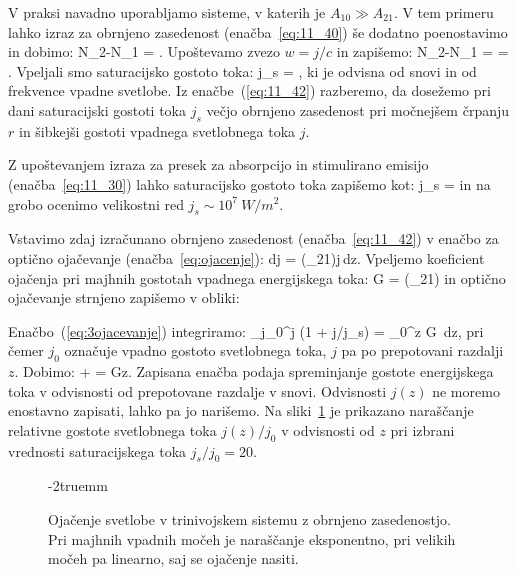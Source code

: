 V praksi navadno uporabljamo sisteme, v katerih je $A_{10}\gg A_{21}$.
V tem primeru lahko izraz za obrnjeno zasedenost (enačba~\ref{eq:11_40}) 
še dodatno poenostavimo in dobimo:
\beq
N_2-N_1 = \cdot{}.
\label{eq:11_41}
\eeq
Upoštevamo zvezo $w = j/c$ in zapišemo:
\beq
N_2-N_1 = \cdot{} = 
\cdot {}.
\label{eq:11_42}
\eeq
Vpeljali smo saturacijsko gostoto toka:
\beq
j_s = ,
\label{eq:11_42a}
\eeq
ki je odvisna od snovi in od frekvence vpadne svetlobe. Iz enačbe~(\ref{eq:11_42}) razberemo, 
da dosežemo pri  dani saturacijski gostoti toka $j_s$ večjo obrnjeno zasedenost
pri močnejšem črpanju $r$ in šibkejši gostoti vpadnega svetlobnega toka $j$.

Z upoštevanjem izraza za presek za absorpcijo in stimulirano emisijo 
(enačba~\ref{eq:11_30}) lahko saturacijsko gostoto toka zapišemo kot:
\beq
j_s = \hslash \omega {}
\label{eq:11_42b}
\eeq
in na grobo ocenimo velikostni red $j_s \sim 10^7~\si{W/m^2}$. 

Vstavimo zdaj izračunano obrnjeno zasedenost (enačba~\ref{eq:11_42}) v enačbo za 
optično ojačevanje (enačba~\ref{eq:ojacenje}):
\beq
dj = \sigma (\omega_{21})\cdot {}j\,dz.
\label{eq:11_43}
\eeq
Vpeljemo koeficient ojačenja pri majhnih gostotah vpadnega 
energijskega toka:
\beq
G = \sigma(\omega_{21})
\label{eq:11_44}
\eeq
in optično ojačevanje strnjeno zapišemo v obliki:

Enačbo~(\ref{eq:3ojacevanje}) integriramo:
\beq
\int_{j_0}^j \left(1 + j/j_s\right) = \int_0^z G\, dz,
\label{eq:11_45}
\eeq
pri čemer $j_0$ označuje vpadno gostoto svetlobnega toka, $j$ pa po 
prepotovani razdalji $z$. Dobimo:
\beq
\ln{} +  = Gz.
\label{eq:11_46}
\eeq
Zapisana enačba podaja spreminjanje gostote
energijskega toka v odvisnosti od prepotovane razdalje v snovi. Odvisnosti
$j(z)$ ne moremo enostavno zapisati, lahko pa jo narišemo.
Na sliki~\ref{fig:11_ojacenje} je prikazano naraščanje
relativne gostote svetlobnega toka $j(z)/j_0$ v odvisnosti od $z$ pri 
izbrani vrednosti saturacijskega toka $j_s/j_0 = 20$.
\begin{figure}[h!]
\centering
\def\svgwidth{70truemm} 

\caption{Ojačenje svetlobe v trinivojskem sistemu z obrnjeno zasedenostjo.
Pri majhnih vpadnih močeh je naraščanje eksponentno, pri velikih močeh 
pa linearno, saj se ojačenje nasiti.
}
\label{fig:11_ojacenje}
\vglue-2truemm
\end{figure}

